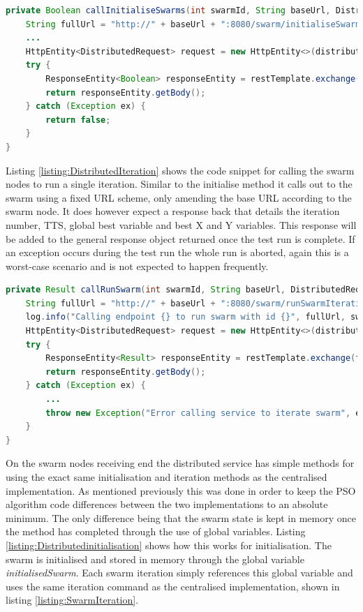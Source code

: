 \documentclass[oneside,12pt]{book}
\begin{document}
\begin{lstlisting}[basicstyle=\footnotesize, language=Java]
private Boolean callInitialiseSwarms(int swarmId, String baseUrl, DistributedRequest distributedRequest) {
    String fullUrl = "http://" + baseUrl + ":8080/swarm/initialiseSwarm";
    ...
    HttpEntity<DistributedRequest> request = new HttpEntity<>(distributedRequest);
    try {
        ResponseEntity<Boolean> responseEntity = restTemplate.exchange(fullUrl, HttpMethod.POST, request, Boolean.class);
        return responseEntity.getBody();
    } catch (Exception ex) {
        return false;
    }
}
\end{lstlisting}
\label{listing:DistributedInit}

Listing \ref{listing:DistributedIteration} shows the code snippet for calling the swarm nodes to run a single iteration. Similar to the initialise method it calls out to the swarm using a fixed URL scheme, only amending the base URL according to the swarm node. It does however expect a response back that details the iteration number, TTS, global best variable and best X and Y variables. This response will be added to the general response object returned once the test run is complete. If an exception occurs during the test run the whole run is aborted, again this is a worst-case scenario and is not expected to happen frequently. 

\begin{lstlisting}[basicstyle=\footnotesize, language=Java]
private Result callRunSwarm(int swarmId, String baseUrl, DistributedRequest distributedRequest) {
    String fullUrl = "http://" + baseUrl + ":8080/swarm/runSwarmIteration";
    log.info("Calling endpoint {} to run swarm with id {}", fullUrl, swarmId);
    HttpEntity<DistributedRequest> request = new HttpEntity<>(distributedRequest);
    try {
        ResponseEntity<Result> responseEntity = restTemplate.exchange(fullUrl, HttpMethod.POST, request, Result.class);
        return responseEntity.getBody();
    } catch (Exception ex) {
        ...
        throw new Exception("Error calling service to iterate swarm", ex);
    }
}
\end{lstlisting}
\label{listing:DistributedIteration}

On the swarm nodes receiving end the distributed service has simple methods for using the exact same initialisation and iteration methods as the centralised implementation. As mentioned previously this was done in order to keep the PSO algorithm code differences between the two implementations to an absolute minimum. The only difference being that the swarm state is kept in memory once the method has completed through the use of global variables. Listing \ref{listing:Distributedinitialisation} shows how this works for initialisation. The swarm is initialised and stored in memory through the global variable \textit{initialisedSwarm}. Each swarm iteration simply references this global variable and uses the same iteration command as the centralised implementation, shown in listing \ref{listing:SwarmIteration}.
\end{document}
